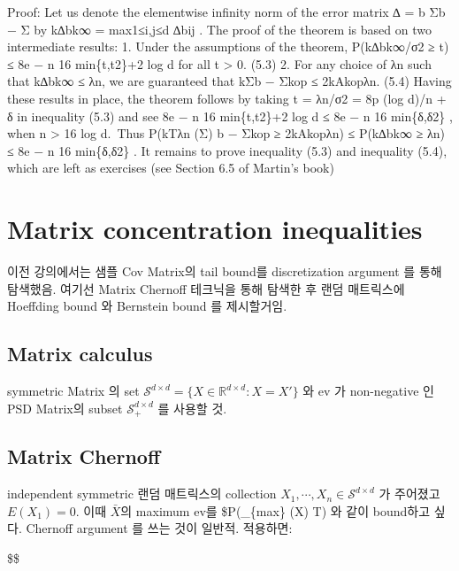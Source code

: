 \documentclass[
]{book}
\begin{document}
{{{Proof: Let us denote the elementwise infinity norm of the error matrix ∆ = b Σb − Σ by
k∆bk∞ = max1≤i,j≤d \textbar∆bij \textbar. The proof of the theorem is based on two intermediate results:
1. Under the assumptions of the theorem,
P(k∆bk∞/σ2 ≥ t) ≤ 8e
− n
16 min\{t,t2\}+2 log d
for all t \textgreater{} 0. (5.3)
2. For any choice of λn such that k∆bk∞ ≤ λn, we are guaranteed that
kΣb − Σkop ≤ 2kAkopλn. (5.4)
Having these results in place, the theorem follows by taking t = λn/σ2 = 8p
(log d)/n + δ
in inequality (5.3) and see
8e
− n
16 min\{t,t2\}+2 log d ≤ 8e
− n
16 min\{δ,δ2\}
,
when n \textgreater{} 16 log d.~Thus
P(kTλn
(Σ) b − Σkop ≥ 2kAkopλn) ≤ P(k∆bk∞ ≥ λn) ≤ 8e
− n
16 min\{δ,δ2\}
.
It remains to prove inequality (5.3) and inequality (5.4), which are left as exercises (see
Section 6.5 of Martin's book)

\hypertarget{matrix-concentration-inequalities}{%
\section{Matrix concentration inequalities}\label{matrix-concentration-inequalities}}

이전 강의에서는 샘플 Cov Matrix의 tail bound를 discretization argument 를 통해 탐색했음. 여기선 Matrix Chernoff 테크닉을 통해 탐색한 후 랜덤 매트릭스에 Hoeffding bound 와 Bernstein bound 를 제시할거임.

\hypertarget{matrix-calculus}{%
\subsection{Matrix calculus}\label{matrix-calculus}}

symmetric Matrix 의 set \(\mathcal S^{d \times d} = \{ X \in \mathbb R^{d \times d} : X = X' \}\) 와 ev 가 non-negative 인 PSD Matrix의 subset \(\mathcal S^{d \times d}_+\) 를 사용할 것.

\hypertarget{matrix-chernoff}{%
\subsection{Matrix Chernoff}\label{matrix-chernoff}}

independent symmetric 랜덤 매트릭스의 collection \(X_1 , \cdots, X_n \in \mathcal S^{d \times d}\) 가 주어졌고 \(E(X_1) = 0\). 이때 \(\bar X\)의 maximum ev를 \$P(\lambda\_\{max\} (\hat X) \ge T) 와 같이 bound하고 싶다. Chernoff argument 를 쓰는 것이 일반적. 적용하면:

\$\$
\begin{align}


\end{align}}}}
\end{document}
